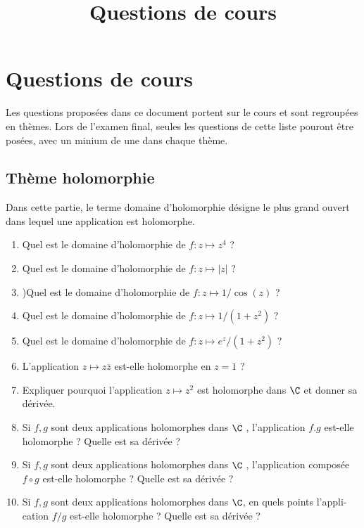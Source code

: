 \documentclass[a4paper, 12pt]{amsart}
\title{Questions de cours}
\begin{document}
\maketitle
%
\section{Questions de cours}
Les questions proposées dans ce document portent sur le cours et sont regroupées en thèmes. Lors de l'examen final, seules les questions de cette liste pouront être
posées, avec un minium de une dans chaque thème.
\subsection{Thème holomorphie}
Dans cette partie, le terme domaine d'holomorphie désigne le plus grand ouvert
dans lequel une application est holomorphe.
\begin{enumerate}
\item Quel est le domaine d'holomorphie de $f : z \mapsto z^4$ ?
\item Quel est le domaine d'holomorphie de $f : z \mapsto |z|$ ?
\item)Quel est le domaine d'holomorphie de $f : z \mapsto 1/ \cos(z)$ ?
\item Quel est le domaine d'holomorphie de $f : z \mapsto 1/(1 + z^2 )$ ?
\item Quel est le domaine d'holomorphie de $f : z \mapsto e^z /(1 + z^2 )$ ?
\item L'application $z \mapsto z\overline{z}$ est-elle holomorphe en $z = 1$ ?
\item Expliquer pourquoi l'application $z \mapsto z^2$ est holomorphe dans $\C$ et donner
sa dérivée.
\item Si $f, g$ sont deux applications holomorphes dans $\C$ , l'application $f.g$ est-elle
holomorphe ? Quelle est sa dérivée ?
\item Si $f, g$ sont deux applications holomorphes dans $\C$ , l'application composée
$f \circ g$ est-elle holomorphe ? Quelle est sa dérivée ?
\item Si $f, g$ sont deux applications holomorphes dans $\C$, en quels points l'appli-
cation $f /g$ est-elle holomorphe ? Quelle est sa dérivée ?
\end{enumerate}
\end{document}
